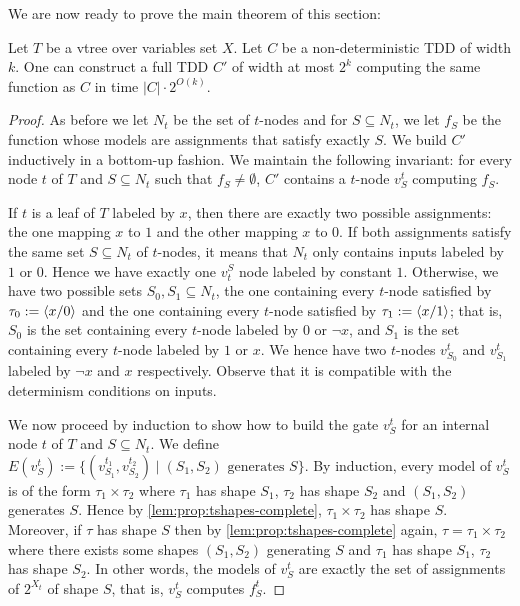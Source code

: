 \documentclass[a4paper,UKenglish,cleveref, autoref, thm-restate]{lipics-v2021}
\newcommand{\guy}[1]{\todo[color=purple]{\color{white}{{\bf Guy}: #1}}}
\begin{document}
\begin{toappendix}
We are now ready to prove the main theorem of this section:
\begin{theorem}
	\label{thm:prop:detTDD} Let $T$ be a vtree over variables set $X$. Let $C$ be a non-deterministic TDD of width $k$. One can construct a full TDD $C'$ of width at most $2^k$ computing the same function as $C$ in time $|C| \cdot 2^{O(k)}$.
\end{theorem}
\begin{proof}
	As before we let $N_t$ be the set of $t$-nodes and for $S \subseteq N_t$, we let $f_S$ be the function whose models are assignments that satisfy exactly $S$.  We build $C'$ inductively in a bottom-up fashion. We maintain the following invariant: for every node $t$ of $T$ and $S \subseteq N_t$ such that $f_S \neq \emptyset$, $C'$ contains a $t$-node $v^t_S$ computing $f_S$.
	
	If $t$ is a leaf of $T$ labeled by $x$, then there are exactly two possible assignments: the one mapping $x$ to $1$ and the other mapping $x$ to $0$. If both assignments satisfy the same set $S \subseteq N_t$ of $t$-nodes, it means that $N_t$ only contains inputs labeled by $1$ or $0$. Hence we have exactly one $v^S_t$ node labeled by constant $1$. Otherwise, we have two possible sets $S_0,S_1 \subseteq N_t$, the one containing every $t$-node satisfied by $\tau_0 := \tup[x/0]$ and the one containing every $t$-node satisfied by $\tau_1 := \tup[x/1]$; that is, $S_0$ is the set containing every $t$-node labeled by $0$ or $\neg x$, and $S_1$ is the set containing every $t$-node labeled by $1$ or $x$.  We hence have two $t$-nodes $v_{S_0}^t$ and $v_{S_1}^t$ labeled by $\neg x$ and $x$
  respectively. Observe that it is compatible with the determinism conditions on inputs. 
	
	We now proceed by induction to show how to build the gate $v_S^t$ for an internal node $t$ of $T$ and $S \subseteq N_t$.  We define $E(v_S^t) := \{(v_{S_1}^{t_1}, v_{S_2}^{t_2}) \mid (S_1,S_2) \text{ generates } S\}$. By induction, every model of $v_S^t$ is of the form $\tau_1 \times \tau_2$ where $\tau_1$ has shape $S_1$, $\tau_2$ has shape $S_2$ and $(S_1,S_2)$ generates $S$. Hence by \cref{lem:prop:tshapes-complete}, $\tau_1 \times \tau_2$ has shape $S$. Moreover, if $\tau$ has shape $S$ then by \cref{lem:prop:tshapes-complete} again, $\tau = \tau_1 \times \tau_2$ where there exists some shapes $(S_1,S_2)$ generating $S$ and $\tau_1$ has shape $S_1$, $\tau_2$ has shape $S_2$. In other words, the models of $v_S^t$ are exactly the set of assignments of $2^{X_t}$ of shape $S$, that is, $v_S^t$ computes $f_S^t$.
	

\end{proof}
\end{toappendix}
\end{document}

